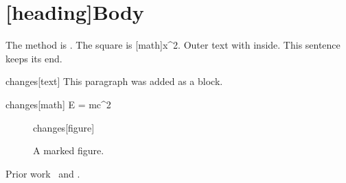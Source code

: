 \section{[heading]{Body}}

The method is .
The square is [math]{x^2}.
Outer text with  inside.
This sentence keeps its end.

\begin{MarkEnv}{changes}[text]
This paragraph was added as a block.
\end{MarkEnv}

\begin{MarkEnv}{changes}[math]
E = mc^2
\end{MarkEnv}

\begin{figure}[h]
  \centering
  \begin{MarkEnv}{changes}[figure]
  \end{MarkEnv}
  \caption{A marked figure.}
\end{figure}

Prior work~\cite{doe2020added} and \cite{roe2021missing}.
